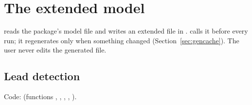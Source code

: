 \documentclass[11pt,a4paper]{article}
\begin{document}
\section{The extended model}\label{sec:generator}

 reads the package's model file and writes an extended
file in .  calls it before every run; it
regenerates only when something changed (Section~\ref{sec:gencache}). The user never edits the
generated file.

\subsection{Lead detection}\label{sec:leads}

Code:  (functions , ,
, , ).
\end{document}
